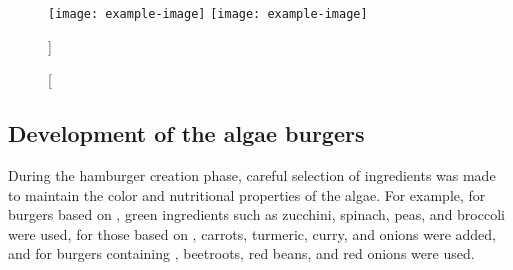 \begin{figure}[H]
\centering
		{\texttt{[image: example-image]}}%
\hfill
		{\texttt{[image: example-image]}}%
\caption%
[]%
{}
\label{fig:}
\end{figure}


\subsection{Development of the algae burgers}
During the hamburger creation phase, careful selection of ingredients was made to maintain the color and nutritional properties of the algae. For example, for burgers based on , green ingredients such as zucchini, spinach, peas, and broccoli were used, for those based on , carrots, turmeric, curry, and onions were added, and for burgers containing , beetroots, red beans, and red onions were used.

